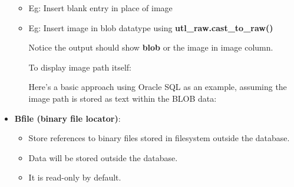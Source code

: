\begin{flushleft}
\begin{itemize}
\begin{itemize}
				\item Eg: Insert blank entry in place of image
				\item Eg: Insert image in blob datatype using \textbf{utl\_raw.cast\_to\_raw()}
			
				Notice the output should show \textbf{blob} or the image in image column.
				
				To display image path itself:
				
				Here's a basic approach using Oracle SQL as an example, assuming the image path is stored as text within the BLOB data:
				
				
				
			\end{itemize}

		
			\newpage
			
			\item \textbf{Bfile (binary file locator)}:
			\begin{itemize}
				\item Store references to binary files stored in filesystem outside the database.
				\item Data will be stored outside the database.
				\item It is read-only by default. 
				\bigskip


\end{itemize}
\end{itemize}
\end{flushleft}
